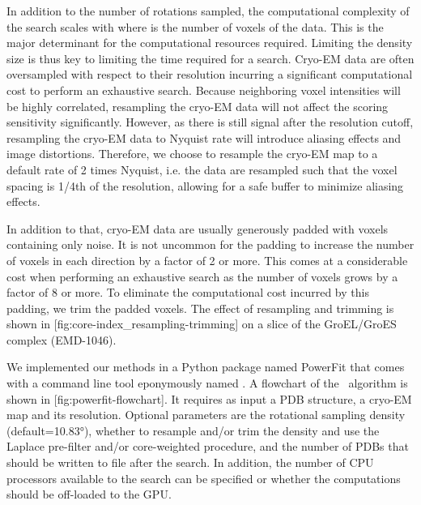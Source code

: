 In addition to the number of rotations sampled, the computational complexity of
the search scales with  where  is the number of
voxels of the data. This is the major determinant for the computational
resources required. Limiting the density size is thus key to limiting the time
required for a search. Cryo-EM data are often oversampled with respect to their
resolution incurring a significant computational cost to perform an exhaustive
search.  Because neighboring voxel intensities will be highly correlated,
resampling the cryo-EM data will not affect the scoring sensitivity
significantly. However, as there is still signal after the resolution cutoff,
resampling the cryo-EM data to Nyquist rate will introduce aliasing effects and
image distortions.  Therefore, we choose to resample the cryo-EM map to a
default rate of 2 times Nyquist, i.e. the data are resampled such that the
voxel spacing is 1/4th of the resolution, allowing for a safe buffer to
minimize aliasing effects. 

In addition to that, cryo-EM data are usually generously padded with voxels
containing only noise. It is not uncommon for the padding to increase the
number of voxels in each direction by a factor of 2 or more. This comes at a
considerable cost when performing an exhaustive search as the number of voxels
grows by a factor of 8 or more. To eliminate the computational cost incurred by
this padding, we trim the padded voxels. The effect of resampling and trimming
is shown in [fig:core-index_resampling-trimming] on a slice of
the GroEL/GroES complex (EMD-1046). 


We implemented our methods in a Python package named PowerFit that comes with a
command line tool eponymously named \powerfit. A flowchart of the \powerfit\
algorithm is shown in [fig:powerfit-flowchart]. It requires as input
a PDB structure, a cryo-EM map and its resolution. Optional parameters are the
rotational sampling density (default=10.83°), whether to resample and/or trim
the density and use the Laplace pre-filter and/or core-weighted procedure, and
the number of PDBs that should be written to file after the search. In
addition, the number of CPU processors available to the search can be specified
or whether the computations should be off-loaded to the GPU. 

{}

